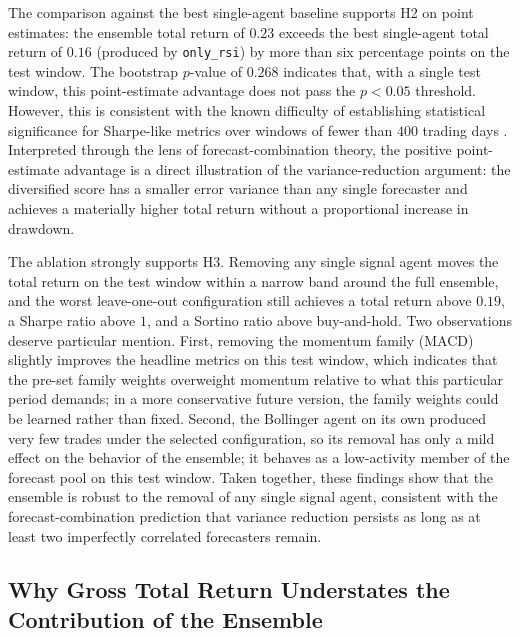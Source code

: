 \documentclass{ieeeaccess}
\newcommand{\TRtest}{\ensuremath{0.23}}
\newcommand{\BestSingleName}{\texttt{only\_rsi}}
\newcommand{\BestSingleTR}{\ensuremath{0.16}}
\newcommand{\PvsBestSingle}{\ensuremath{0.268}}
\begin{document}
The comparison against the best single-agent baseline supports H2 on point estimates: the ensemble total return of $\TRtest$ exceeds the best single-agent total return of $\BestSingleTR$ (produced by \BestSingleName{}) by more than six percentage points on the test window. The bootstrap $p$-value of $\PvsBestSingle$ indicates that, with a single test window, this point-estimate advantage does not pass the $p < 0.05$ threshold. However, this is consistent with the known difficulty of establishing statistical significance for Sharpe-like metrics over windows of fewer than $400$ trading days \cite{bailey2014}. Interpreted through the lens of forecast-combination theory, the positive point-estimate advantage is a direct illustration of the variance-reduction argument: the diversified score has a smaller error variance than any single forecaster and achieves a materially higher total return without a proportional increase in drawdown.

The ablation strongly supports H3. Removing any single signal agent moves the total return on the test window within a narrow band around the full ensemble, and the worst leave-one-out configuration still achieves a total return above $0.19$, a Sharpe ratio above $1$, and a Sortino ratio above buy-and-hold. Two observations deserve particular mention. First, removing the momentum family (MACD) slightly improves the headline metrics on this test window, which indicates that the pre-set family weights overweight momentum relative to what this particular period demands; in a more conservative future version, the family weights could be learned rather than fixed. Second, the Bollinger agent on its own produced very few trades under the selected configuration, so its removal has only a mild effect on the behavior of the ensemble; it behaves as a low-activity member of the forecast pool on this test window. Taken together, these findings show that the ensemble is robust to the removal of any single signal agent, consistent with the forecast-combination prediction that variance reduction persists as long as at least two imperfectly correlated forecasters remain.

\subsection{Why Gross Total Return Understates the Contribution of the Ensemble}
\end{document}
